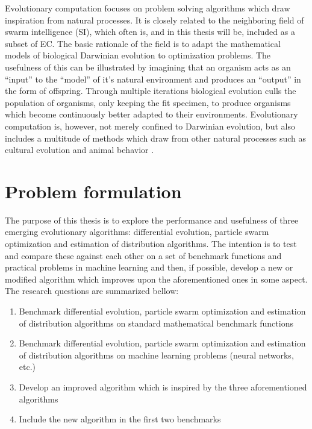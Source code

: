 \documentclass[12pt, titlepage, a4paper]{article}
\begin{document}
Evolutionary computation focuses on problem solving algorithms which draw inspiration from natural processes. It is closely related to the neighboring field of swarm intelligence (SI), which often is, and in this thesis will be, included as a subset of EC. The basic rationale of the field is to adapt the mathematical models of biological Darwinian evolution to optimization problems. The usefulness of this can be illustrated by imagining that an organism acts as an ``input'' to the ``model'' of it's natural environment and produces an ``output'' in the form of offspring. Through multiple iterations biological evolution culls the population of organisms, only keeping the fit specimen, to produce organisms which become continuously better adapted to their environments. Evolutionary computation is, however, not merely confined to Darwinian evolution, but also includes a multitude of methods which draw from other natural processes such as cultural evolution and animal behavior \cite{engelbrecht2007computational}.

\section{Problem formulation}

The purpose of this thesis is to explore the performance and usefulness of three emerging evolutionary algorithms: differential evolution, particle swarm optimization and estimation of distribution algorithms. The intention is to test and compare these against each other on a set of benchmark functions and practical problems in machine learning and then, if possible, develop a new or modified algorithm which improves upon the aforementioned ones in some aspect. The research questions are summarized bellow:

\begin{enumerate}
  \item Benchmark differential evolution, particle swarm optimization and estimation of distribution algorithms on standard mathematical benchmark functions
  \item Benchmark differential evolution, particle swarm optimization and estimation of distribution algorithms on machine learning problems (neural networks, etc.)
  \item Develop an improved algorithm which is inspired by the three aforementioned algorithms
  \item Include the new algorithm in the first two benchmarks
\end{enumerate}
\end{document}
